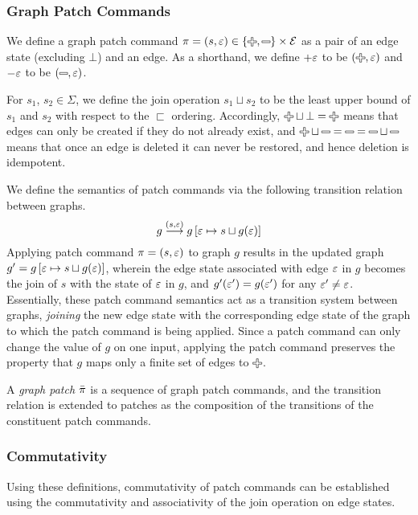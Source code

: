 \subsubsection{Graph Patch Commands}
\label{subsub:Graph Patches}

We define a graph patch command $\pi = (s,\e) \in \left\{\Plus, \Minus\right\} \times \E$
as a pair of an edge state (excluding $\bot$) and an edge. As a shorthand, we define $+\varepsilon$ to be $(\Plus, \e)$ and $-\varepsilon$ to be $(\Minus, \e)$.

For $s_1$, $s_2 \in \Sigma$, we define the join operation $s_1 \sqcup s_2$ to be the least upper bound of $s_1$ and $s_2$ with respect to the $\sqsubset$ ordering. Accordingly, $\Plus \sqcup \bot = \Plus$ means that edges can only be created if they do not already exist, and $\Plus \sqcup \Minus = \Minus = \Minus \sqcup \Minus$ means that once an edge is deleted it can never be restored, and hence deletion is idempotent.

We define the semantics of patch commands via the following transition relation
between graphs.
\[
  g \overset{(s,\varepsilon)}{\longrightarrow} g\left[ \varepsilon \mapsto s \sqcup g(\varepsilon) \right]
\]
Applying patch command $\pi = \left(s, \varepsilon\right)$ to graph $g$ results in the updated graph $g' = g\left[\varepsilon \mapsto s \sqcup g(\varepsilon) \right]$, wherein the edge
state associated with edge $\varepsilon$ in $g$ becomes the join of $s$ with the state of $\varepsilon$ in $g$, and $g'(\varepsilon') = g(\varepsilon')$ for any $\varepsilon' \ne \varepsilon$. Essentially, these patch command semantics act as a transition system between graphs, \emph{joining} the new edge state with the corresponding edge state of the graph to which the patch command is being applied. Since a patch command can only change the value of $g$ on one input, applying the patch command preserves the property that $g$ maps only a finite set of edges to $\Plus$.  

A \textit{graph patch} $\bar{\pi}$ is a sequence of graph patch commands, and the transition relation is extended to patches as the composition of the transitions of the constituent patch commands. 

\subsubsection{Commutativity}%
\label{subsub:Commutativity:formal}

Using these definitions, commutativity of patch commands can be established using the commutativity and associativity of the join operation on edge states. 


